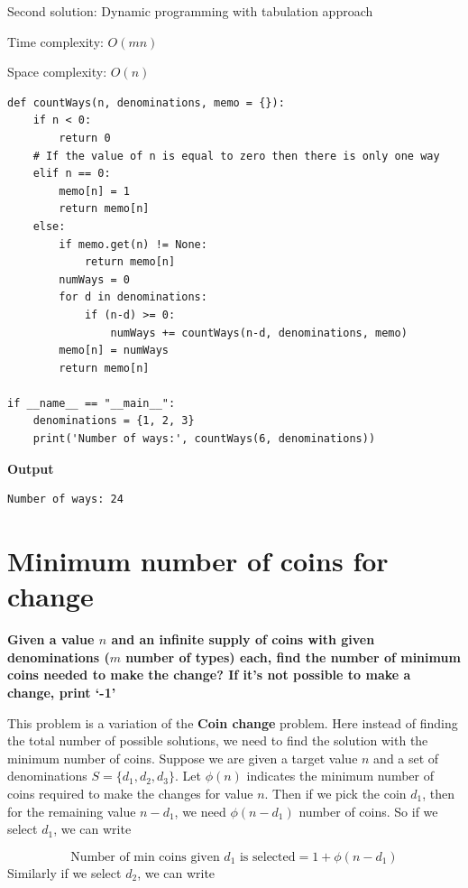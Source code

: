 \documentclass[a4paper,11pt]{book}
\begin{document}
\noindent Second solution: Dynamic programming with tabulation approach
\vspace{5mm}

\noindent Time complexity: $O(mn)$

\noindent Space complexity: $O(n)$

\begin{lstlisting}
def countWays(n, denominations, memo = {}):
    if n < 0:
        return 0
    # If the value of n is equal to zero then there is only one way
    elif n == 0:
        memo[n] = 1
        return memo[n]
    else:
        if memo.get(n) != None:
            return memo[n]
        numWays = 0
        for d in denominations:
            if (n-d) >= 0:
                numWays += countWays(n-d, denominations, memo)
        memo[n] = numWays
        return memo[n]

if __name__ == "__main__":
    denominations = {1, 2, 3}
    print('Number of ways:', countWays(6, denominations))
\end{lstlisting}
\textbf{Output}
\begin{lstlisting}
Number of ways: 24
\end{lstlisting}

\newpage
\section{Minimum number of coins for change}

\noindent \textbf{Given a value $n$ and an infinite supply of coins with given denominations ($m$ number of types) each, find the number of minimum coins needed to make the change?  If it's not possible to make a change, print `-1'}

\vspace{5mm}

\noindent This problem is a variation of the \textbf{Coin change} problem. Here instead of finding the total number of possible solutions, we need to find the solution with the minimum number of coins. Suppose we are given a target value $n$ and a set of denominations $S = \{d_1, d_2, d_3\}$. Let $\phi(n)$ indicates the minimum number of coins required to make the changes for value $n$. Then if we pick the coin $d_1$, then for the remaining value $n-d_1$, we need $\phi(n-d_1)$ number of coins. So if we select $d_1$, we can write

$$\text{Number of min coins given $d_1$ is selected} = 1 + \phi(n-d_1)$$
\noindent Similarly if we select $d_2$, we can write
\end{document}
